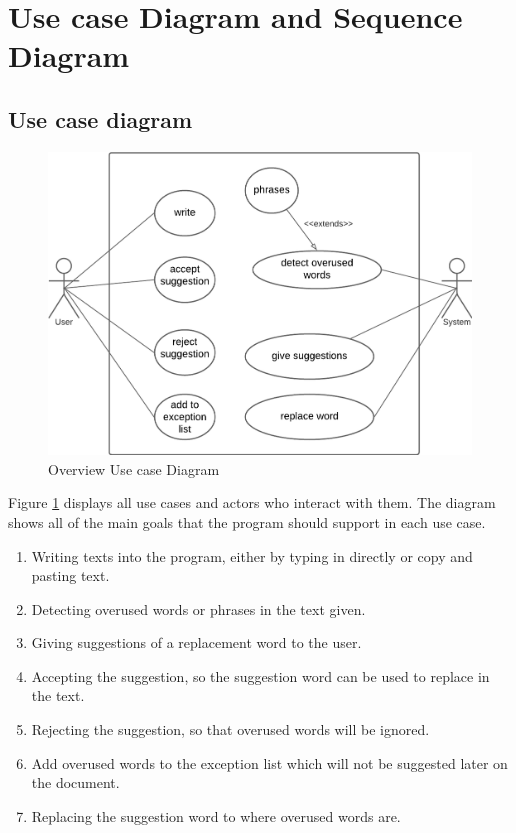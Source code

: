 \documentclass[12pt,oneside,openright,a4paper]{cpe-english-project}
\begin{document}
\section{Use case Diagram and Sequence Diagram}

\subsection{Use case diagram}
\begin{figure}[!h]\centering
\includegraphics[width=15cm]{./img/chp3/Usecase.png}
\caption{Overview Use case Diagram}\label{fig:usecase}
\end{figure}

Figure \ref{fig:usecase} displays all use cases and actors who interact with them. The diagram shows all of the main goals that the program should support in each use case.

\begin{enumerate}
\item Writing texts into the program, either by typing in directly or copy and pasting text.
\item Detecting overused words or phrases in the text given.
\item Giving suggestions of a replacement word to the user.
\item Accepting the suggestion, so the suggestion word can be used to replace in the text.
\item Rejecting the suggestion, so that overused words will be ignored.
\item Add overused words to the exception list which will not be suggested later on the document.
\item Replacing the suggestion word to where overused words are.
\end{enumerate}
\end{document}
